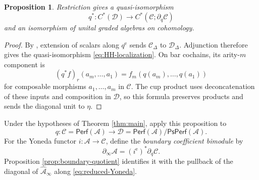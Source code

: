 \documentclass[11pt,letterpaper,reqno]{amsart}
\theoremstyle{plain}
\newtheorem{proposition}[proposition]{Proposition}
\theoremstyle{definition}
\theoremstyle{plain}
\theoremstyle{definition}
\numberwithin{equation}{section}
\begin{document}
\begin{proposition}\label{prop:HH-localization}
Restriction gives a quasi-isomorphism
\begin{equation}\label{eq:HH-localization}
q^*:C^*(\mathscr D)\longrightarrow C^*(\mathscr C;\partial_q\mathscr C)
\end{equation}
and an isomorphism of unital graded algebras on cohomology.
\end{proposition}
\begin{proof}
By \cite[Proposition 3.10(a)]{Keller2011}, extension of scalars along $q^{\mathrm e}$ sends $\mathscr C_\Delta$ to $\mathscr D_\Delta$.
Adjunction therefore gives the quasi-isomorphism \eqref{eq:HH-localization}.
On bar cochains, its arity-$m$ component is
\[
(q^*f)_r(a_m,\ldots,a_1)
=f_m(q(a_m),\ldots,q(a_1))
\]
for composable morphisms $a_1,\ldots,a_m$ in $\mathscr C$.
The cup product uses deconcatenation of these inputs and composition in $\mathscr D$, so this formula preserves products and sends the diagonal unit to $\eta$.
\end{proof}

Under the hypotheses of Theorem \ref{thm:main}, apply this proposition to
\[
q:\mathscr C=\mathsf{Perf}(\mathscr A)
\longrightarrow\mathscr D
=\mathsf{Perf}(\mathscr A)/\mathsf{PsPerf}(\mathscr A).
\]
For the Yoneda functor $i:\mathscr A\to\mathscr C$, define the \emph{boundary coefficient bimodule} by
\begin{equation}\label{eq:boundary-coefficient-A}
\partial_\infty\mathscr A=(i^{\mathrm e})^*\partial_q\mathscr C.
\end{equation}
Proposition \ref{prop:boundary-quotient} identifies it with the pullback of the diagonal of $\widehat{\mathscr A}_\infty$ along \eqref{eq:reduced-Yoneda}.
\end{document}
